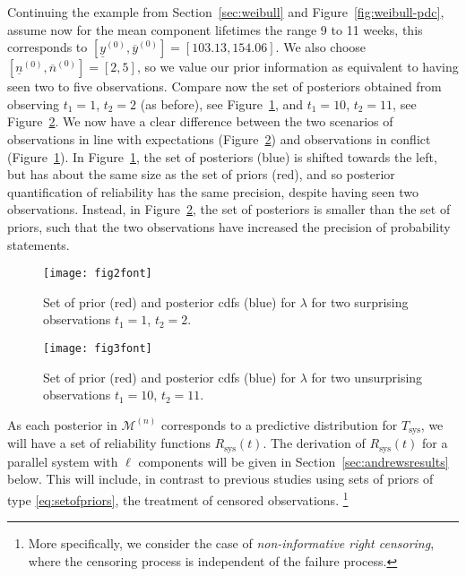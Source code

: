 \documentclass[12pt,a4paper,twocolumn,fleqn]{narms}
\newcommand{\uz}{^{(0)}} %
\newcommand{\un}{^{(n)}} %
\newcommand{\ul}[1]{\underline{#1}}
\newcommand{\ol}[1]{\overline{#1}}
\def\yzl{\ul{y}\uz}
\def\yzu{\ol{y}\uz}
\def\nzl{\ul{n}\uz}
\def\nzu{\ol{n}\uz}
\def\MN{\mathcal{M}\un}
\newcommand{\comments}[1]{{\small\color{gray} #1}}
\begin{document}
Continuing the example from Section~\ref{sec:weibull} and Figure~\ref{fig:weibull-pdc},
assume now for the mean component lifetimes the range 9 to 11 weeks,
this corresponds to $[\yzl,\yzu] = [103.13, 154.06]$.
We also choose $[\nzl,\nzu] =[2, 5]$,
so we value our prior information as equivalent to having seen two to five observations.
Compare now the set of posteriors obtained from observing
$t_1 = 1$, $t_2 = 2$ (as before), see Figure~\ref{fig:setofpost-pdc},
and $t_1 = 10$, $t_2 = 11$, see Figure~\ref{fig:setofpost-nopdc}.
We now have a clear difference between the two scenarios of
observations in line with expectations (Figure~\ref{fig:setofpost-nopdc})
and observations in conflict (Figure~\ref{fig:setofpost-pdc}).
In Figure~\ref{fig:setofpost-pdc}, the set of posteriors (blue)
is shifted towards the left, but has about the same size as the set of priors (red),
and so posterior quantification of reliability has the same precision,
despite having seen two observations.
Instead, in Figure~\ref{fig:setofpost-nopdc}, the set of posteriors
is smaller than the set of priors,
such that the two observations have increased the precision of probability statements.

\begin{figure}
\texttt{[image: fig2font]}
\caption{Set of prior (red) and posterior cdfs (blue) for $\lambda$ for two surprising observations $t_1 = 1$, $t_2 = 2$.}
\label{fig:setofpost-pdc}
\end{figure}

\begin{figure}
\texttt{[image: fig3font]}
\caption{Set of prior (red) and posterior cdfs (blue) for $\lambda$ for two unsurprising observations $t_1 = 10$, $t_2 = 11$.}
\label{fig:setofpost-nopdc}
\end{figure}

%
As each posterior in $\MN$ corresponds to a predictive distribution for $T_\text{sys}$,
we will have a set of reliability functions $R_\text{sys}(t)$.
The derivation of $R_\text{sys}(t)$ for a parallel system with $\ell$ components
will be given in Section~\ref{sec:andrewsresults} below.
This will include, in contrast to previous studies using sets of priors of type 
\eqref{eq:setofpriors}, the treatment of censored observations.%
\footnote{More specifically, we consider the case of \emph{non-informative right censoring},
where the censoring process is independent of the failure process.}
\end{document}
